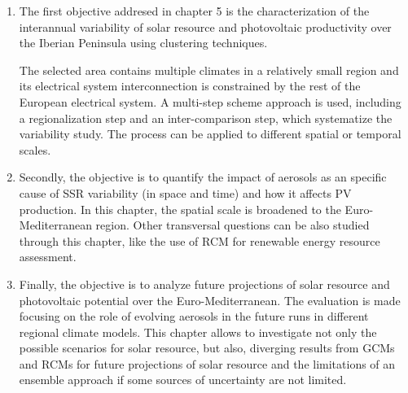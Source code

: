 \begin{enumerate}
\item The first objective addresed in chapter 5 is the characterization of the interannual variability of solar resource and photovoltaic productivity over the Iberian Peninsula using clustering techniques.

  The selected area contains multiple climates in a relatively small region and its electrical system interconnection is constrained by the rest of the European electrical system. A multi-step scheme approach is used, including a regionalization step and an inter-comparison step, which systematize the variability study. The process can be applied to different spatial or temporal scales.

\item Secondly, the objective is to quantify the impact of aerosols as an specific cause of SSR variability (in space and time)  and how it affects PV production. In this chapter, the spatial scale is broadened to the Euro-Mediterranean region. Other transversal questions can be also studied through this chapter, like the use of RCM for renewable energy resource assessment.

\item Finally, the objective is to analyze future projections  of solar resource and photovoltaic potential over the Euro-Mediterranean. The evaluation is made focusing on the role of evolving aerosols in the future runs in different regional climate models. This chapter allows to investigate not only the possible scenarios for solar resource, but also, diverging results from GCMs and RCMs for future projections of solar resource and the limitations of an ensemble approach if some sources of uncertainty are not limited.

\end{enumerate}  





% 